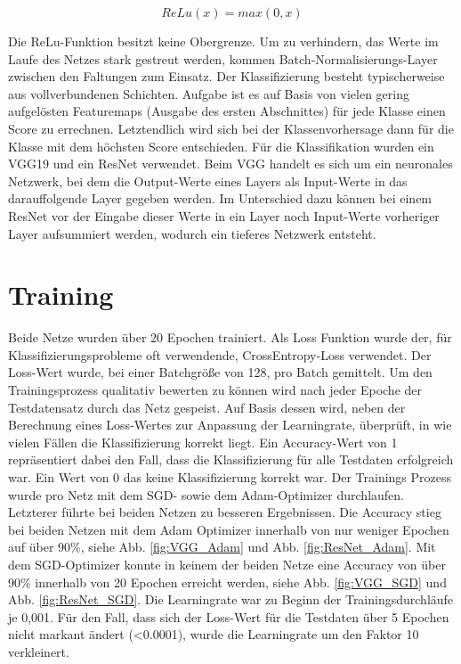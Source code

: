 \documentclass[sigconf]{acmart}
\begin{document}
\begin{equation}\label{ReLu}
ReLu(x) = max(0,x)
\end{equation}


Die ReLu-Funktion besitzt keine Obergrenze. Um zu verhindern, das Werte im Laufe des Netzes stark gestreut werden, kommen Batch-Normalisierungs-Layer \cite{ioffe2015batch} zwischen den Faltungen zum Einsatz. 
Der Klassifizierung besteht typischerweise aus vollverbundenen Schichten. Aufgabe ist es auf Basis von vielen gering aufgelösten Featuremaps (Ausgabe des ersten Abschnittes) für jede Klasse einen Score zu errechnen. Letztendlich wird sich bei der Klassenvorhersage dann für die Klasse mit dem höchsten Score entschieden. 
Für die Klassifikation wurden ein VGG19 und ein ResNet verwendet. Beim VGG handelt es sich um ein neuronales Netzwerk, bei dem die Output-Werte eines Layers als Input-Werte in das darauffolgende Layer gegeben werden. Im Unterschied dazu können bei einem ResNet vor der Eingabe dieser Werte in ein Layer noch Input-Werte vorheriger Layer aufsummiert werden, wodurch ein tieferes Netzwerk entsteht. 

\section{Training}
\label{section:training}
Beide Netze wurden über 20 Epochen trainiert. Als Loss Funktion wurde der, für Klassifizierungsprobleme oft verwendende, CrossEntropy-Loss verwendet. Der Loss-Wert wurde, bei einer Batchgröße von 128, pro Batch gemittelt.  
Um den Trainingsprozess qualitativ bewerten zu können wird nach jeder Epoche der Testdatensatz durch das Netz gespeist. Auf Basis dessen wird, neben der Berechnung eines Loss-Wertes zur Anpassung der Learningrate, überprüft, in wie vielen Fällen die Klassifizierung korrekt liegt.  Ein Accuracy-Wert von 1 repräsentiert dabei den Fall, dass die Klassifizierung für alle Testdaten erfolgreich war. Ein Wert von 0 das keine Klassifizierung korrekt war. 
Der Trainings Prozess wurde pro Netz mit dem SGD- sowie dem Adam-Optimizer durchlaufen. Letzterer führte bei beiden Netzen zu besseren Ergebnissen. Die Accuracy stieg bei beiden Netzen mit dem Adam Optimizer innerhalb von nur weniger Epochen auf über 90\%, siehe Abb. \ref{fig:VGG_Adam} und Abb. \ref{fig:ResNet_Adam}. Mit dem SGD-Optimizer konnte in keinem der beiden Netze eine Accuracy von über 90\% innerhalb von 20 Epochen erreicht werden, siehe Abb. \ref{fig:VGG_SGD} und Abb. \ref{fig:ResNet_SGD}.
\newline
\newline
Die Learningrate war zu Beginn der Trainingsdurchläufe je 0,001. Für den Fall, dass sich der Loss-Wert für die Testdaten über 5 Epochen nicht markant ändert (<0.0001), wurde die Learningrate um den Faktor 10 verkleinert. 
\end{document}
